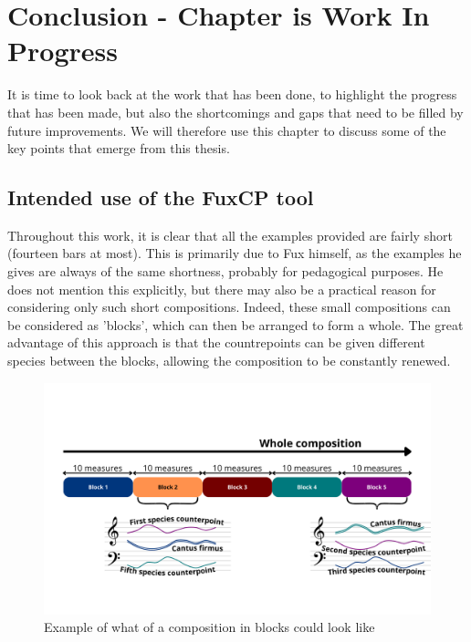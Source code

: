 \chapter{Conclusion - Chapter is Work In Progress}
It is time to look back at the work that has been done, to highlight the progress that has been made, but also the shortcomings and gaps that need to be filled by future improvements. We will therefore use this chapter to discuss some of the key points that emerge from this thesis.
 
\section{Intended use of the FuxCP tool}
Throughout this work, it is clear that all the examples provided are fairly short (fourteen bars at most). This is primarily due to Fux himself, as the examples he gives are always of the same shortness, probably for pedagogical purposes. He does not mention this explicitly, but there may also be a practical reason for considering only such short compositions. Indeed, these small compositions can be considered as 'blocks', which can then be arranged to form a whole. The great advantage of this approach is that the countrepoints can be given different species between the blocks, allowing the composition to be constantly renewed.

\begin{figure}[h]
  \centering
  \includegraphics[width=1\textwidth]{Images/composition-in-blocks.png}
  \caption{Example of what of a composition in blocks could look like}
  \label{fig:composition-in-blocks}
\end{figure}

